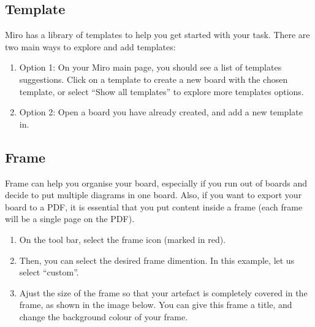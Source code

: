 \documentclass[letterpaper,10pt,english]{jupyterBook}
\begin{document}
\subsection{Template}
\label{\detokenize{appendices/appendix_d/miro_guide:template}}
\sphinxAtStartPar
Miro has a library of templates to help you get started with your task. There are two main ways to explore and
add templates:
\begin{enumerate}
%
\item {} 
\sphinxAtStartPar
Option 1: On your Miro main page, you should see a list of templates suggestions. Click on a template to create a
new board with the chosen template, or select “Show all templates” to explore more templates options.

\item {} 
\sphinxAtStartPar
Option 2: Open a board you have already created, and add a new template in.

\end{enumerate}


\subsection{Frame}
\label{\detokenize{appendices/appendix_d/miro_guide:frame}}
\sphinxAtStartPar
Frame can help you organise your board, especially if you run out of boards and decide to put multiple diagrams in
one board. Also, if you want to export your board to a PDF, it is essential that you put content inside a frame
(each frame will be a single page on the PDF).

\sphinxAtStartPar
{}
\begin{enumerate}
%
\item {} 
\sphinxAtStartPar
On the tool bar, select the frame icon (marked in red).

\item {} 
\sphinxAtStartPar
Then, you can select the desired frame dimention. In this example, let us select “custom”.

\item {} 
\sphinxAtStartPar
Ajust the size of the frame so that your artefact is completely covered in the frame, as shown in the image
below. You can give this frame a title, and change the background colour of your frame.

\end{enumerate}
\end{document}
